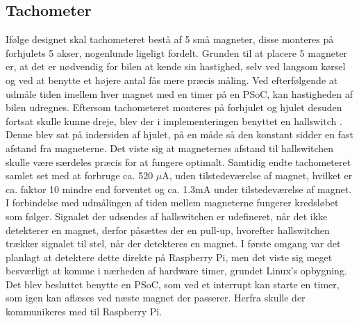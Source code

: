 \subsection{Tachometer}\label{sec:hwi_tacho}

Ifølge designet skal tachometeret bestå af 5 små magneter, disse monteres på forhjulets 5 akser, nogenlunde ligeligt fordelt. 
Grunden til at placere 5 magneter er, at det er nødvendig for bilen at kende sin hastighed, selv ved langsom kørsel og ved at benytte et højere antal fås mere præcis måling.
Ved efterfølgende at udmåle tiden imellem hver magnet med en timer på en PSoC, kan hastigheden af bilen udregnes.
Eftersom tachometeret monteres på forhjulet og hjulet desuden fortsat skulle kunne dreje, blev der i implementeringen benyttet en hallswitch \cite{lib:tacho}. 
Denne blev sat på indersiden af hjulet, på en måde så den konstant sidder en fast afstand fra magneterne. 
Det viste sig at magneternes afstand til hallswitchen skulle være særdeles præcis for at fungere optimalt. 
Samtidig endte tachometeret samlet set med at forbruge ca. 520 $\mu$A, uden tilstedeværelse af magnet, hvilket er ca. faktor 10 mindre end forventet og ca. 1.3mA under tilstedeværelse af magnet. 
I forbindelse med udmålingen af tiden mellem magneterne fungerer kredsløbet som følger. 
Signalet der udsendes af hallswitchen er udefineret, når det ikke detekterer en magnet, derfor påsættes der en pull-up, hvorefter hallswitchen trækker signalet til stel, når der detekteres en magnet. 
I første omgang var det planlagt at detektere dette direkte på Raspberry Pi, men det viste sig meget besværligt at komme i nærheden af hardware timer, grundet Linux's opbygning. 
Det blev  besluttet benytte en PSoC, som ved et interrupt kan starte en timer, som igen kan aflæses ved næste magnet der passerer. 
Herfra skulle der kommunikeres med \IIC til Raspberry Pi. 
 